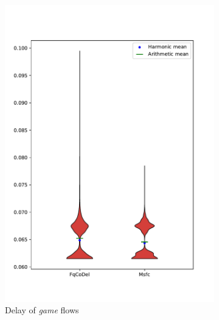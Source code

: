 \begin{figure}
	\centering
	\begin{subfigure}[b]{0.475\textwidth}
		\centering
		\includegraphics[width=\textwidth]{drawings/type2-delay-down_B}
		\caption[]%
		{{\small Delay of \emph{game} flows}}    
		\label{fig:delay_voip_A}
	\end{subfigure}
	\hfill
	\begin{subfigure}[b]{0.475\textwidth}  
		\centering 

\end{subfigure}
\end{figure}
